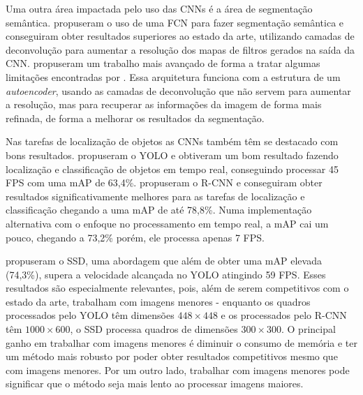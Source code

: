 Uma outra área impactada pelo uso das \ac{CNN}s é a área de segmentação semântica.  propuseram o uso de uma \ac{FCN} para fazer segmentação semântica e conseguiram obter resultados superiores ao estado da arte, utilizando camadas de deconvolução para aumentar a resolução dos mapas de filtros gerados na saída da \ac{CNN}.  propuseram um trabalho mais avançado de forma a tratar algumas limitações encontradas por . Essa arquitetura funciona com a estrutura de um \textit{autoencoder}, usando as camadas de deconvolução que não servem para aumentar a resolução, mas para recuperar as informações da imagem de forma mais refinada, de forma a melhorar os resultados da segmentação.

Nas tarefas de localização de objetos as \ac{CNN}s também têm se destacado com bons resultados.  propuseram o \ac{YOLO} e obtiveram um bom resultado fazendo localização e classificação de objetos em tempo real, conseguindo processar 45 \ac{FPS} com uma \ac{mAP} de 63,4\%.  propuseram o \ac{R-CNN} e conseguiram obter resultados significativamente melhores para as tarefas de localização e classificação chegando a uma \ac{mAP} de até 78,8\%. Numa implementação alternativa com o enfoque no processamento em tempo real, a \ac{mAP} cai um pouco, chegando a 73,2\% porém, ele processa apenas 7 \ac{FPS}.

 propuseram o \ac{SSD}, uma abordagem que além de obter uma \ac{mAP} elevada (74,3\%), supera a velocidade alcançada no \ac{YOLO} atingindo 59 \ac{FPS}. Esses resultados são especialmente relevantes, pois, além de serem competitivos com o estado da arte, trabalham com imagens menores - enquanto os quadros processados pelo \ac{YOLO} têm dimensões $448 \times 448$ e os processados pelo \ac{R-CNN} têm $1000\times 600$, o \ac{SSD} processa quadros de dimensões $300 \times 300$. O principal ganho em trabalhar com imagens menores é diminuir o consumo de memória e ter um método mais robusto por poder obter resultados competitivos mesmo que com imagens menores. Por um outro lado, trabalhar com imagens menores pode significar que o método seja mais lento ao processar imagens maiores.

